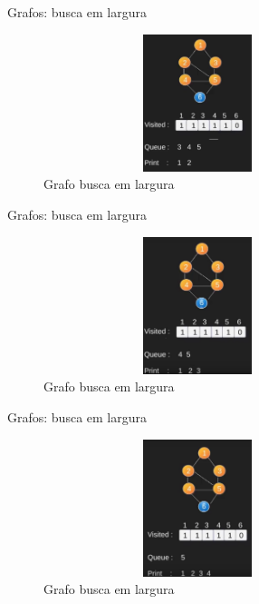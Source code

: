\begin{frame}
	\begin{block}{Grafos: busca em largura}
		\begin{figure}[!htb]
			\centering	  
			\includegraphics[height=4cm, width = 9cm]{./pic/bfs6.png}
			\caption{Grafo busca em largura}
		\end{figure}
	\end{block}
\end{frame}

\begin{frame}
	\begin{block}{Grafos: busca em largura}
		\begin{figure}[!htb]
			\centering	  
			\includegraphics[height=4cm, width = 9cm]{./pic/bfs7.png}
			\caption{Grafo busca em largura}
		\end{figure}
	\end{block}
\end{frame}

\begin{frame}
	\begin{block}{Grafos: busca em largura}
		\begin{figure}[!htb]
			\centering	  
			\includegraphics[height=4cm, width = 9cm]{./pic/bfs8.png}
			\caption{Grafo busca em largura}
		\end{figure}
	\end{block}
\end{frame}

